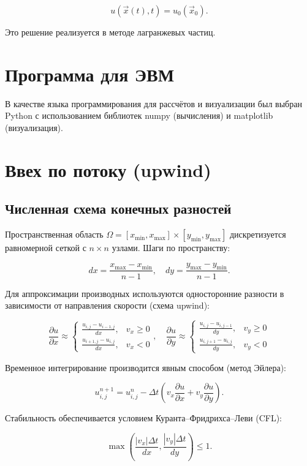\begin{equation}
	u(\vec{x}(t), t) = u_0(\vec{x}_0).
	\label{eq:solution_along_characteristics}
\end{equation}

Это решение реализуется в методе лагранжевых частиц.
\section{Программа для ЭВМ}
В качестве языка программирования для рассчётов и
визуализации был выбран Python с использованием библиотек numpy
(вычисления) и matplotlib (визуализация).
\section{Ввех по потоку (upwind)}
\subsection{Численная схема конечных разностей}

Пространственная область \(\Omega = [x_{\min}, x_{\max}] \times [y_{\min}, y_{\max}]\) дискретизуется равномерной сеткой с \(n \times n\) узлами. Шаги по пространству:

\[
dx = \frac{x_{\max} - x_{\min}}{n - 1}, \quad dy = \frac{y_{\max} - y_{\min}}{n - 1}.
\]

Для аппроксимации производных используются односторонние разности в зависимости от направления скорости (схема upwind):

\[
\frac{\partial u}{\partial x} \approx
\begin{cases}
	\frac{u_{i,j} - u_{i-1,j}}{dx}, & v_x \geq 0 \\
	\frac{u_{i+1,j} - u_{i,j}}{dx}, & v_x < 0
\end{cases}, \quad
\frac{\partial u}{\partial y} \approx
\begin{cases}
	\frac{u_{i,j} - u_{i,j-1}}{dy}, & v_y \geq 0 \\
	\frac{u_{i,j+1} - u_{i,j}}{dy}, & v_y < 0
\end{cases}
\]

Временное интегрирование производится явным способом (метод Эйлера):

\[
u_{i,j}^{n+1} = u_{i,j}^{n} - \Delta t \left( v_x \frac{\partial u}{\partial x} + v_y \frac{\partial u}{\partial y} \right).
\]

Стабильность обеспечивается условием Куранта–Фридрихса–Леви (CFL):

\begin{equation}
	\max \left( \frac{|v_x| \Delta t}{dx}, \frac{|v_y| \Delta t}{dy} \right) \leq 1.
	\label{eq:cfl_condition}
\end{equation}

